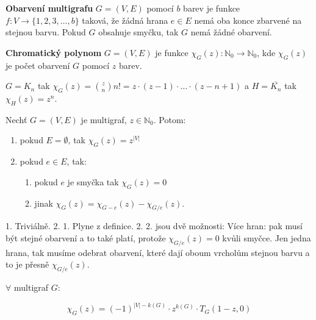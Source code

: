 \begin{definice}
	\textbf{Obarvení multigrafu} $G=(V,E)$ pomocí $b$ barev je funkce $f: V \to \{1,2,3, \dots ,b\}$ taková, že žádná hrana $e \in E$ nemá oba konce zbarvené na stejnou barvu. Pokud $G$ obsahuje smyčku, tak $G$ nemá žádné obarvení.
\end{definice}

\begin{definice}
	\textbf{Chromatický polynom} $G= (V,E)$ je funkce $\chi_{G}(z): \mathbb{N}_{0} \to \mathbb{N}_{0}$, kde $\chi_{G}(z)$ je počet obarvení $G$ pomocí $z$ barev.
\end{definice}

\begin{cvic}
	$G = K_{n}$ tak $\chi_{G}(z) = \binom{z}{n}n! = z \cdot (z-1) \cdot \dots \cdot (z - n +1)$ a $H = \bar{K_{n}}$ tak $\chi_{H}(z) = z^{n}$.
\end{cvic}

\begin{tvrz}
	Nechť $G = (V,E)$ je multigraf, $z \in \mathbb{N}_{0}$. Potom:
	
	\begin{enumerate}
		\item pokud $E = \emptyset$, tak $\chi_{G}(z) = z^{|V|}$
		\item pokud $e \in E$, tak:
		\begin{enumerate}
			\item pokud $e$ je smyčka tak $\chi_{G}(z) = 0$
			\item jinak $\chi_{G}(z) = \chi_{G-e}(z) - \chi_{G/e}(z)$.
		\end{enumerate}
	\end{enumerate}
\end{tvrz}

\begin{dukaz}
	1. Triviálně. 2. 1. Plyne z definice. 2. 2. jsou dvě možnosti: Více hran: pak musí být stejné obarvení a to také platí, protože $\chi_{G/e}(z) = 0$ kvůli smyčce. Jen jedna hrana, tak musíme odebrat obarvení, které dají oboum vrcholům stejnou barvu a to je přesně $\chi_{G/e}(z)$.
\end{dukaz}

\begin{tvrz}
	$\forall$ multigraf $G$:
	
	$$
	\chi_{G}(z) = (-1)^{|V| - k(G)} \cdot z^{k(G)} \cdot T_{G}(1-z,0)
	$$
\end{tvrz}

